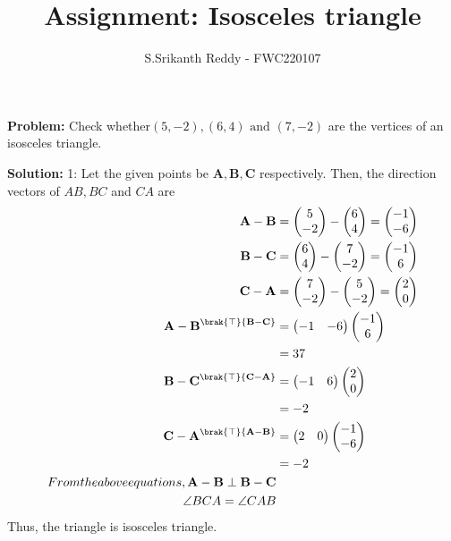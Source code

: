 \documentclass{article}
\newcommand{\myvec}[1]{\ensuremath{\begin{pmatrix}#1\end{pmatrix}}}
\let\vec\mathbf
\newcommand{\Problem}{\noindent \textbf{Problem: }}
\newcommand{\solution}{\noindent \textbf{Solution: }}
\begin{document}
\title{Assignment: Isosceles triangle}
\author{\Large S.Srikanth Reddy - FWC220107}
\date{}
\maketitle
\Problem Check whether$(5,-2),(6,4) \text{ and } (7,-2)$ are the vertices of an isosceles triangle.
\begin{table}[h!]
	\small
	\centering
     
	\label{table:12table1}
	\end{table}

\solution 1:
Let the given points be $\vec{A}, \vec{B}, \vec{C}$ respectively. 
Then, the direction vectors of $AB, BC$ and $CA$ are
\begin{align}
\vec{A}-\vec{B}&=\myvec{5\\-2}-\myvec{6\\4}=\myvec{-1\\-6}\\
\vec{B}-\vec{C}&=\myvec{6\\4}-\myvec{7\\-2}=\myvec{-1\\6}\\
\vec{C}-\vec{A}&=\myvec{7\\-2}-\myvec{5\\-2}=\myvec{2\\0}\\
{\vec{A} -\vec{B}}^\brak{\top}{\vec{B} -\vec{C}}&=  \myvec{-1 & -6}\myvec{-1 \\ 6}\\
&=37\\
{\vec{B} -\vec{C}}^\brak{\top}{\vec{C} -\vec{A}}&=  \myvec{-1 & 6}\myvec{2 \\ 0}\\
&=-2\\
{\vec{C} -\vec{A}}^\brak{\top}{\vec{A} -\vec{B}}&=  \myvec{2 & 0}\myvec{-1 \\ -6}\\
&=-2\\
From  the above equations,
{\vec{A} -\vec{B}}\perp {\vec{B} -\vec{C}}\\
\angle BCA = \angle CAB  
\end{align}
Thus, the triangle is isosceles triangle.
\end{document}
